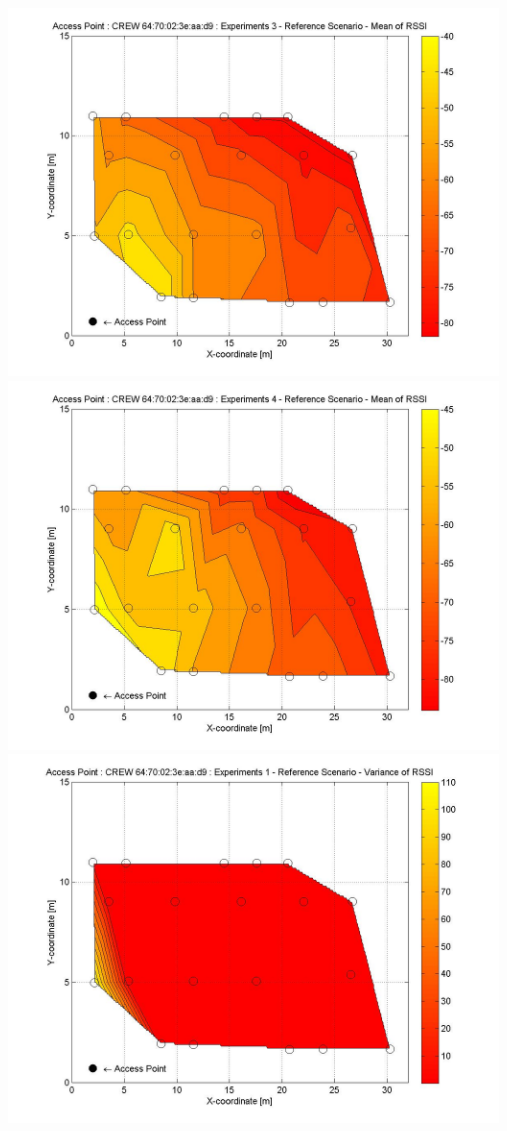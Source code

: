 \documentclass[11pt,a4paper,headinclude,footinclude,chapterprefix=on]{scrreprt}
\begin{document}
\begin{longtable}
	\includegraphics[width=13cm]{../../Source/plot/CREW_d9/d9_Ref_Ex_3_Mean.jpg} \\
	\includegraphics[width=13cm]{../../Source/plot/CREW_d9/d9_Ref_Ex_4_Mean.jpg} \\
	\includegraphics[width=13cm]{../../Source/plot/CREW_d9/d9_Ref_Ex_1_Variance.jpg} \\

\end{longtable}
\end{document}
